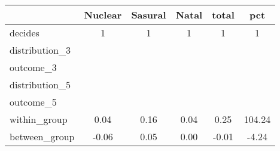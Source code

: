 \begin{tabular}{l*{5}{c}}
\toprule
            &\multicolumn{1}{c}{Nuclear}&\multicolumn{1}{c}{Sasural}&\multicolumn{1}{c}{Natal}&\multicolumn{1}{c}{total}&\multicolumn{1}{c}{pct}\\
\midrule
decides     &           1&           1&           1&           1&           1\\
\midrule
distribution\_3&            &            &            &            &            \\
outcome\_3   &            &            &            &            &            \\
distribution\_5&            &            &            &            &            \\
outcome\_5   &            &            &            &            &            \\
within\_group&        0.04&        0.16&        0.04&        0.25&      104.24\\
between\_group&       -0.06&        0.05&        0.00&       -0.01&       -4.24\\
\bottomrule
\end{tabular}
